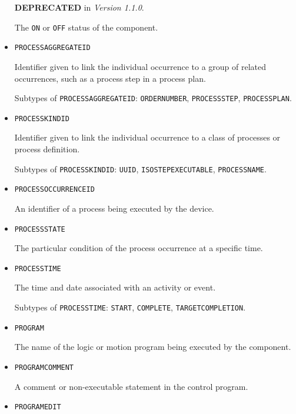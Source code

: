 \begin{itemize}
\textbf{DEPRECATED} in \textit{Version 1.1.0}.

The \texttt{ON} or \texttt{OFF} status of the component.


\item \texttt{PROCESS\textunderscore AGGREGATE\textunderscore ID}  

Identifier given to link the individual occurrence to a group of related occurrences, such as a process step in a process plan.

Subtypes of \texttt{PROCESS\textunderscore AGGREGATE\textunderscore ID}: \texttt{ORDER\textunderscore NUMBER}, \texttt{PROCESS\textunderscore STEP}, \texttt{PROCESS\textunderscore PLAN}.

\item \texttt{PROCESS\textunderscore KIND\textunderscore ID}  

Identifier given to link the individual occurrence to a class of processes or process definition.


Subtypes of \texttt{PROCESS\textunderscore KIND\textunderscore ID}: \texttt{UUID}, \texttt{ISO\textunderscore STEP\textunderscore EXECUTABLE}, \texttt{PROCESS\textunderscore NAME}.

\item \texttt{PROCESS\textunderscore OCCURRENCE\textunderscore ID}  

An identifier of a process being executed by the device.


\item \texttt{PROCESS\textunderscore STATE}  

The particular condition of the process occurrence at a specific time.


\item \texttt{PROCESS\textunderscore TIME}  

The time and date associated with an activity or event.

Subtypes of \texttt{PROCESS\textunderscore TIME}: \texttt{START}, \texttt{COMPLETE}, \texttt{TARGET\textunderscore COMPLETION}.

\item \texttt{PROGRAM}  

The name of the logic or motion program being executed by the  component.


\item \texttt{PROGRAM\textunderscore COMMENT}  

A comment or non-executable statement in the control program.


\item \texttt{PROGRAM\textunderscore EDIT}  


\end{itemize}
